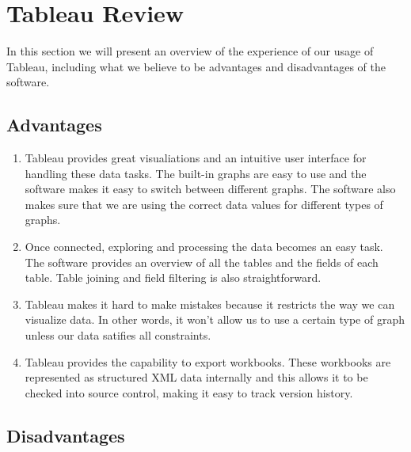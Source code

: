 \documentclass[10pt]{article}
\begin{document}
\section{Tableau Review}

In this section we will present an overview of the experience of our usage of Tableau, including what we believe to be advantages and disadvantages of the software.

\subsection{Advantages}

\begin{enumerate}

\item Tableau provides great visualiations and an intuitive user interface for handling these data tasks. The built-in graphs are easy to use and the software makes it easy to switch between different graphs. The software also makes sure that we are using the correct data values for different types of graphs.

\item Once connected, exploring and processing the data becomes an easy task. The software provides an overview of all the tables and the fields of each table. Table joining and field filtering is also straightforward.

\item Tableau makes it hard to make mistakes because it restricts the way we can visualize data. In other words, it won't allow us to use a certain type of graph unless our data satifies all constraints.

\item Tableau provides the capability to export workbooks. These workbooks are represented as structured XML data internally and this allows it to be checked into source control, making it easy to track version history.

\end{enumerate}

\subsection{Disadvantages}
\end{document}
